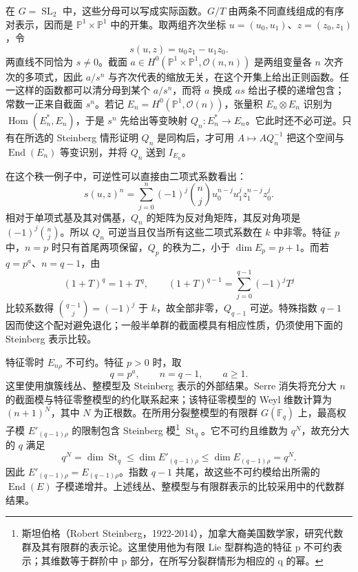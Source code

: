 \begin{proofsketch}
	在 \(G=\operatorname{SL}_2\) 中，这些分母可以写成实际函数。\(G/T\) 由两条不同直线组成的有序对表示，因而是 \(\mathbb P^1\times\mathbb P^1\) 中的开集。取两组齐次坐标 \(u=(u_0,u_1)\)、\(z=(z_0,z_1)\)，令
	\[
		s(u,z)=u_0z_1-u_1z_0.
	\]
	两直线不同恰为 \(s\ne0\)。截面 \(a\in H^0(\mathbb P^1\times\mathbb P^1,\mathcal O(n,n))\) 是两组变量各 \(n\) 次齐次的多项式，因此 \(a/s^n\) 与齐次代表的缩放无关，在这个开集上给出正则函数。任一这样的函数都可以清分母到某个 \(a/s^n\)，而将 \(a\) 换成 \(as\) 给出子模的递增包含；常数一正来自截面 \(s^n\)。若记 \(E_n=H^0(\mathbb P^1,\mathcal O(n))\)，张量积 \(E_n\otimes E_n\) 识别为 \(\operatorname{Hom}(E_n^*,E_n)\)，于是 \(s^n\) 先给出等变映射 \(Q_n:E_n^*\to E_n\)。它此时还不必可逆。只有在所选的 Steinberg 情形证明 \(Q_n\) 是同构后，才可用 \(A\mapsto A Q_n^{-1}\) 把这个空间与 \(\operatorname{End}(E_n)\) 等变识别，并将 \(Q_n\) 送到 \(I_{E_n}\)。

	在这个秩一例子中，可逆性可以直接由二项式系数看出：
	\[
		s(u,z)^n=\sum_{j=0}^n(-1)^j\binom nj u_0^{n-j}u_1^jz_1^{n-j}z_0^j.
	\]
	相对于单项式基及其对偶基，\(Q_n\) 的矩阵为反对角矩阵，其反对角项是 \((-1)^j\binom nj\)。所以 \(Q_n\) 可逆当且仅当所有这些二项式系数在 \(k\) 中非零。特征 \(p\) 中，\(n=p\) 时只有首尾两项保留，\(Q_p\) 的秩为二，小于 \(\dim E_p=p+1\)。而若 \(q=p^a\)、\(n=q-1\)，由
	\[
		(1+T)^q=1+T^q,\qquad (1+T)^{q-1}=\sum_{j=0}^{q-1}(-1)^jT^j
	\]
	比较系数得 \(\binom{q-1}{j}=(-1)^j\) 于 \(k\)，故全部非零，\(Q_{q-1}\) 可逆。特殊指数 \(q-1\) 因而使这个配对避免退化；一般半单群的截面模具有相应性质，仍须使用下面的 Steinberg 表示比较。

	特征零时 \(E_{n\rho}\) 不可约。特征 \(p>0\) 时，取
	\[
		q=p^a,\qquad n=q-1,\qquad a\ge1.
	\]
	这里使用旗簇线丛、整模型及 Steinberg 表示的外部结果。Serre 消失将充分大 \(n\) 的截面模与特征零整模型的约化联系起来；该特征零模型的 Weyl 维数计算为 \((n+1)^N\)，其中 \(N\) 为正根数。在所用分裂整模型的有限群 \(G(\mathbb F_q)\) 上，最高权子模 \(E'_{(q-1)\rho}\) 的限制包含 Steinberg 模\footnote{斯坦伯格（Robert Steinberg，1922-2014），加拿大裔美国数学家，研究代数群及其有限群的表示论。这里使用他为有限 Lie 型群构造的特征 p 不可约表示；其维数等于群阶中 p 部分，在所写分裂群情形为相应的 q 的幂。} \(\operatorname{St}_q\)。它不可约且维数为 \(q^N\)，故充分大的 \(q\) 满足
	\[
		q^N=\dim\operatorname{St}_q \le\dim E'_{(q-1)\rho} \le\dim E_{(q-1)\rho} =q^N.
	\]
	因此 \(E'_{(q-1)\rho}=E_{(q-1)\rho}\)。指数 \(q-1\) 共尾，故这些不可约模给出所需的 \(\operatorname{End}(E)\) 子模递增并。上述线丛、整模型与有限群表示的比较采用\cite[Section 3, Proposition 2, pp. 142--143]{Demazure1976MumfordConjecture}中的代数群结果。


\end{proofsketch}
